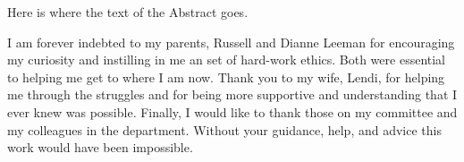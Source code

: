 \documentclass[11pt]{psuthesis}
\begin{document}
\begin{frontmatter}


\begin{doublespace}
\titlepage
\end{doublespace}

\committeepage

\abstract

Here is where the text of the Abstract goes.





\tables


\acknowledgments  %

I am forever indebted to my parents, Russell and Dianne Leeman for encouraging my curiosity and instilling in me an set of hard-work ethics. Both were essential to helping me get to where I am now. Thank you to my wife, Lendi, for helping me through the struggles and for being more supportive and understanding that I ever knew was possible. Finally, I would like to thank those on my committee and my colleagues in the department. Without your guidance, help, and advice this work would have been impossible.



\end{frontmatter}
\end{document}

